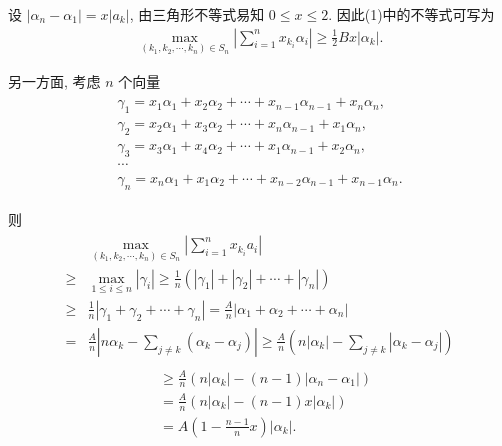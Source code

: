 \begin{solution}
	设 $\left|\alpha_n-\alpha_1\right|=x\left|a_k\right|$, 由三角形不等式易知 $0 \leqslant x \leqslant 2$. 因此(1)中的不等式可写为
	\begin{align*}
		\max _{\left(k_1, k_2, \cdots, k_n\right) \in S_n}\left|\sum_{i=1}^n x_{k_i} \alpha_i\right| \geqslant \frac{1}{2} B x\left|\alpha_k\right| .
	\end{align*}

	另一方面, 考虑 $n$ 个向量
	\begin{align*}
		\begin{gathered}
			\gamma_1=x_1 \alpha_1+x_2 \alpha_2+\cdots+x_{n-1} \alpha_{n-1}+x_n \alpha_n, \\
			\gamma_2=x_2 \alpha_1+x_3 \alpha_2+\cdots+x_n \alpha_{n-1}+x_1 \alpha_n, \\
			\gamma_3=x_3 \alpha_1+x_4 \alpha_2+\cdots+x_1 \alpha_{n-1}+x_2 \alpha_n, \\
			\cdots \\
			\gamma_n=x_n \alpha_1+x_1 \alpha_2+\cdots+x_{n-2} \alpha_{n-1}+x_{n-1} \alpha_n .
		\end{gathered}
	\end{align*}

	则
	\begin{align*}
		\begin{aligned}
			          & \max _{\left(k_1, k_2, \cdots, k_n\right) \in S_n}\left|\sum_{i=1}^n x_{k_i} a_i\right|                                                                                                 \\
			\geqslant & \max _{1 \leqslant i \leqslant n}\left|\gamma_i\right| \geqslant \frac{1}{n}\left(\left|\gamma_1\right|+\left|\gamma_2\right|+\cdots+\left|\gamma_n\right|\right)                       \\
			\geqslant & \frac{1}{n}\left|\gamma_1+\gamma_2+\cdots+\gamma_n\right|=\frac{A}{n}\left|\alpha_1+\alpha_2+\cdots+\alpha_n\right|                                                                     \\
			=         & \frac{A}{n}\left|n \alpha_k-\sum_{j \neq k}\left(\alpha_k-\alpha_j\right)\right| \geqslant \frac{A}{n}\left(n\left|\alpha_k\right|-\sum_{j \neq k}\left|\alpha_k-\alpha_j\right|\right)
		\end{aligned}
	\end{align*}
	\begin{align*}
		\begin{aligned}
			 & \geqslant \frac{A}{n}\left(n\left|\alpha_k\right|-(n-1)\left|\alpha_n-\alpha_1\right|\right) \\
			 & =\frac{A}{n}\left(n\left|\alpha_k\right|-(n-1) x\left|\alpha_k\right|\right)                 \\
			 & =A\left(1-\frac{n-1}{n} x\right)\left|\alpha_k\right| .
		\end{aligned}
	\end{align*}


\end{solution}
